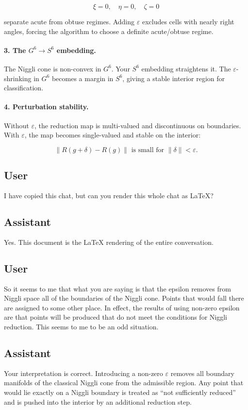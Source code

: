 \documentclass[12pt]{article}
\begin{document}
	
	\[
	\xi = 0,\quad \eta = 0,\quad \zeta = 0
	\]
	
	
	separate acute from obtuse regimes.  
	Adding $\varepsilon$ excludes cells with nearly right angles, forcing the algorithm to choose a definite acute/obtuse regime.
	
	\paragraph{3. The $G^6 \to S^6$ embedding.}
	The Niggli cone is non-convex in $G^6$.  
	Your $S^6$ embedding straightens it.  
	The $\varepsilon$-shrinking in $G^6$ becomes a margin in $S^6$, giving a stable interior region for classification.
	
	\paragraph{4. Perturbation stability.}
	Without $\varepsilon$, the reduction map is multi-valued and discontinuous on boundaries.  
	With $\varepsilon$, the map becomes single-valued and stable on the interior:
	
	
	\[
	\|R(g + \delta) - R(g)\| \text{ is small for } \|\delta\| < \varepsilon.
	\]
	
	
	
	\subsection*{User}
	I have copied this chat, but can you render this whole chat as \LaTeX?
	
	\subsection*{Assistant}
	Yes.  
	This document is the \LaTeX{} rendering of the entire conversation.
	
	
	\subsection*{User}
	So it seems to me that what you are saying is that the epsilon removes from Niggli space all of the boundaries of the Niggli cone. Points that would fall there are assigned to some other place. In effect, the results of using non-zero epsilon are that points will be produced that do not meet the conditions for Niggli reduction. This seems to me to be an odd situation.
	
	\subsection*{Assistant}
	Your interpretation is correct. Introducing a non-zero $\varepsilon$ removes all boundary manifolds of the classical Niggli cone from the admissible region. Any point that would lie exactly on a Niggli boundary is treated as ``not sufficiently reduced'' and is pushed into the interior by an additional reduction step.
	
\end{document}
